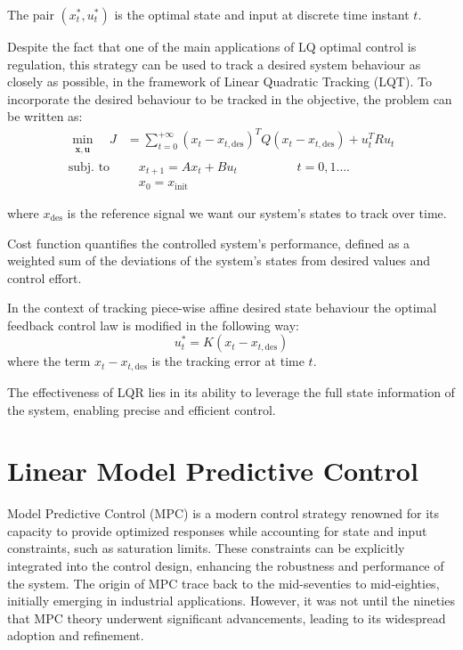 \documentclass[a4paper,12pt,oneside]{book}
\begin{document}
The pair $(x_t^*, u_t^*)$ is the optimal state and input at discrete time instant $t$.

\bigskip
Despite the fact that one of the main applications of LQ optimal control is regulation, this strategy can be used to track a desired system behaviour as closely as possible, in the framework of Linear Quadratic Tracking (LQT).
To incorporate the desired behaviour to be tracked in the objective, the problem can be written as:
\begin{equation}
\begin{aligned}
	\min_{\substack{\boldsymbol{x}, \boldsymbol{u}}}\quad J &= \sum_{t=0}^{+\infty}  (x_t - x_{t,\text{des}})^T Q (x_t - x_{t,\text{des}}) + u_t^T R u_t  \\
	\text{subj. to} & \quad x_{t+1}  = A x_t + B u_t \hspace{2cm} t = 0, 1 \ldots. \\
    & \quad x_0 = x_{\text{init}}
\end{aligned}
\label{eq:LQR}
\end{equation}

where $x_{\text{des}}$ is the reference signal we want our system's states to track over time.

Cost function quantifies the controlled system's performance, defined as a weighted sum of the deviations of the system's states from desired values and control effort.

In the context of tracking piece-wise affine desired state behaviour the optimal feedback control law is modified in the following way:
\begin{equation}
    u_t^* = K (x_t - x_{t,\text{des}})
\end{equation}
where the term $x_t - x_{t,\text{des}}$ is the tracking error at time $t$.

The effectiveness of LQR lies in its ability to leverage the full state information of the system, enabling precise and efficient control.


\section{Linear Model Predictive Control}
Model Predictive Control (MPC) is a modern control strategy renowned for its capacity to provide optimized responses while accounting for state and input constraints, such as saturation limits.
These constraints can be explicitly integrated into the control design, enhancing the robustness and performance of the system. 
The origin of MPC trace back to the mid-seventies to mid-eighties, initially emerging in industrial applications. 
However, it was not until the nineties that MPC theory underwent significant advancements, leading to its widespread adoption and refinement.
\end{document}
